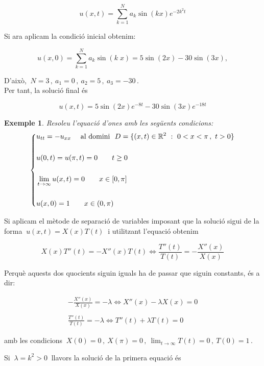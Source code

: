 \documentclass[12pt]{article}
\newtheorem{exemple}{Exemple}[subsection]
\newcommand{\R}{\mathbb{R}}
\begin{document}
$$
u(x,t)=\sum_{k=1}^N a_k\sin\left(k x\right)e^{-2k^2 t}
$$

Si ara aplicam la condici{\'o} inicial obtenim:

\[
u(x,0)= \sum_{k=1}^N a_k\sin\left(k\; x\right)=5\sin(2x)-30\sin(3x),
\]

D'aix{\`o}, $\ N=3\,,\ a_1=0\,,\ a_2=5\,,\ a_3=-30\,.$\\

 Per tant, la soluci{\'o} final {\'e}s

\[
 u(x,t)=5\sin(2x)e^{-8t}-30\sin(3x)e^{-18 t}
\]


\vspace{0.7cm}
\begin{exemple}
Resoleu l'equaci{\'o} d'ones amb les seg{\"u}ents condicions:
\begin{equation}\label{ondas}
\left\{\begin{split}
&u_{tt}=-u_{xx}\quad \hbox{ al domini } \ D=\{(x,t)\in\R^2\ :\  0<x<\pi\,,\ t>0\}\\
\\
&u(0,t)=u(\pi,t)=0 \qquad t\geq 0\\
\\
&\lim_{t\to \infty} u(x,t)=0\qquad x\in[0,\pi]\\
\\
&u(x,0)=1\qquad x\in(0,\pi)
 \end{split}\right.
\end{equation}
\end{exemple}

Si aplicam el m{\`e}tode de separaci{\'o} de variables imposant que la soluci{\'o} sigui de la forma $\ u(x,t)=X(x)T(t)\ $ i
utilitzant l'equaci{\'o} obtenim

\[
X(x) T''(t)=-X''(x)T(t) \iff \frac{T''(t)}{T(t)}=-\frac{X''(x)}{X(x)}
\]

Perqu{\`e} aquests dos quocients siguin iguals ha de passar que siguin constants, {\'e}s a dir:

\[
\begin{split}
-\frac{X''(x)}{X(x)}=-\lambda\iff X''(x)-\lambda X(x)=0\\
\\
 \frac{T''(t)}{T(t)}=-\lambda\iff T''(t)+\lambda T(t)=0
\end{split}
\]

amb les condicions $\ X(0)=0\,,\ X(\pi)=0\,,\ \displaystyle\lim_{t\to \infty}T(t)=0\,,\ T(0)=1\,.$

Si $\ \lambda=k^2>0\ $ llavors la soluci{\'o} de la primera equaci{\'o} {\'e}s
\end{document}

